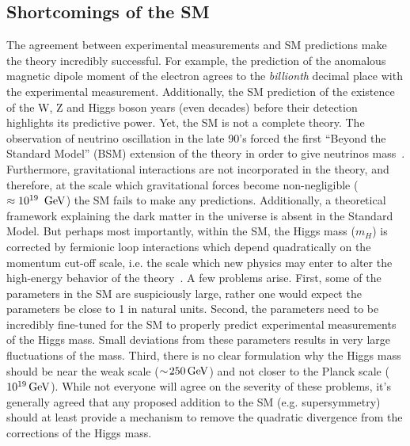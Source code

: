 \subsection{Shortcomings of the SM}
The agreement between experimental measurements and SM predictions make
the theory incredibly successful. For example, the prediction of the anomalous magnetic dipole 
moment of the electron agrees to the \textit{billionth} decimal place with the experimental 
measurement. Additionally, the SM prediction of the existence of the W, Z and Higgs boson
years (even decades) before their detection highlights its predictive power. Yet, the SM is not 
a complete theory. The observation of neutrino oscillation in the late 90's forced the first 
``Beyond the Standard Model'' (BSM) extension of the theory in order to give neutrinos 
mass~\cite{zuber2003neutrino}. Furthermore, gravitational interactions are not incorporated in the theory,
and therefore, at the scale which gravitational forces become non-negligible 
($\approx 10^{19}~\,\text{Ge\hspace{-.08em}V}$) the SM fails to make any predictions. Additionally, a theoretical 
framework explaining the dark matter in the universe is absent in the Standard Model.
But perhaps most importantly, within the SM, the Higgs mass ($m_{H}$) is corrected by fermionic
loop interactions which depend quadratically on the momentum cut-off scale, i.e. the scale 
which new physics may enter to alter the high-energy behavior of the theory~\cite{Martin:1997ns}.
A few problems arise. First, some of the parameters in the SM are suspiciously large, rather one 
would expect the parameters be close to 1 in natural units. Second, the parameters
need to be incredibly fine-tuned for the SM to properly predict experimental measurements of the
Higgs mass. Small deviations from these parameters results in very large fluctuations of the mass. 
Third, there is no clear formulation why the Higgs mass should be near the weak scale ($\sim\!250\,\text{Ge\hspace{-.08em}V}$) 
and not closer to the Planck scale ($10^{19}\,\text{Ge\hspace{-.08em}V}$). While not everyone will agree on the 
severity of these problems, it's generally agreed that any proposed addition to the SM 
(e.g. supersymmetry) should at least provide a mechanism to remove the quadratic divergence from the corrections of 
the Higgs mass.

